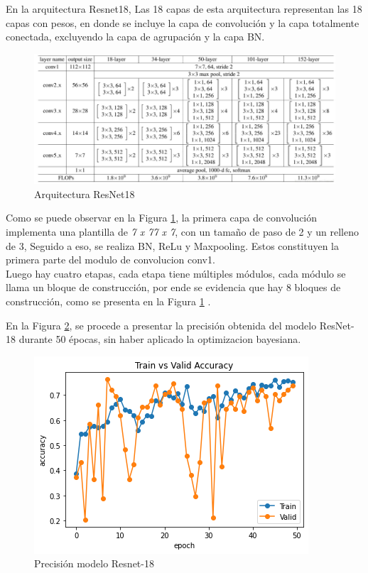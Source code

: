 				\newpage
				En la arquitectura Resnet18, Las 18 capas de esta arquitectura representan las 18 capas con pesos, en donde se incluye la capa de convolución y la capa totalmente conectada, excluyendo la capa de agrupación y la capa BN.
				
				\begin{figure}[ht]
					\centering
					\includegraphics[scale=0.65]{Figs/68.png}
					\caption{Arquitectura ResNet18}
					\label{fig:ArqRes18}
				\end{figure}
				

				Como se puede observar en la Figura \ref{fig:ArqRes18}, la primera capa de convolución implementa una plantilla de \textit{7 x 77 x 7}, con un tamaño de paso de 2 y un relleno de 3, Seguido a eso, se realiza BN, ReLu y Maxpooling. Estos constituyen la primera parte del modulo de convolucion conv1.\\
					
				Luego hay cuatro etapas, cada etapa tiene múltiples módulos, cada módulo se llama un bloque de construcción, por ende se evidencia que hay 8 bloques de construcción, como se presenta en la Figura \ref{fig:ArqRes18} \cite{ref_5}.				
		

\newpage	
		En la Figura \ref{fig:preci_RESNET18}, se procede a presentar la precisión obtenida del modelo ResNet-18 durante 50 épocas, sin haber aplicado la optimizacion bayesiana.
		
		\begin{figure}[ht]
			\centering
			\includegraphics[scale=0.55]{Figs/109.png}
			\caption{Precisión modelo Resnet-18}
			\label{fig:preci_RESNET18}
		\end{figure}
	
